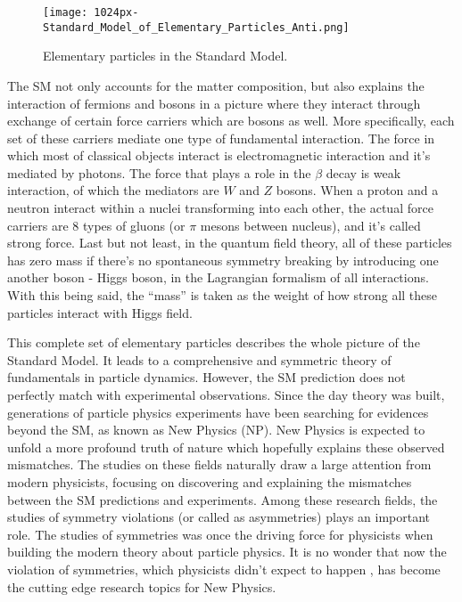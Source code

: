 \begin{figure}[H]
	\centering
	\texttt{[image: 1024px-Standard\_Model\_of\_Elementary\_Particles\_Anti.png]}
	\caption{Elementary particles in the Standard Model.\cite{sm_particles}}
	\label{fig:sm-table}
\end{figure}

The SM not only accounts for the matter composition, but also explains the interaction of fermions and bosons in a picture where they interact through exchange of certain force carriers which are bosons as well. More specifically, each set of these carriers mediate one type of fundamental interaction. The force in which most of classical objects interact is electromagnetic interaction and it's mediated by photons. The force that plays a role in the $\beta$ decay is weak interaction, of which the mediators are $\textit{W}$ and $\textit{Z}$ bosons. When a proton and a neutron interact within a nuclei transforming into each other, the actual force carriers are 8 types of gluons (or $\pi$ mesons between nucleus), and it's called strong force. Last but not least, in the quantum field theory, all of these particles has zero mass if there's no spontaneous symmetry breaking by introducing one another boson - Higgs boson, in the Lagrangian formalism of all interactions. With this being said, the ``mass'' is taken as the weight of how strong all these particles interact with Higgs field.

 This complete set of elementary particles describes the whole picture of the Standard Model. It leads to a comprehensive and symmetric theory of fundamentals in particle dynamics. However, the SM prediction does not perfectly match with experimental observations. Since the day theory was built, generations of particle physics experiments have been searching for evidences beyond the SM, as known as New Physics (NP). New Physics is expected to unfold a more profound truth of nature which hopefully explains these observed mismatches. The studies on these fields naturally draw a large attention from modern physicists, focusing on discovering and explaining the mismatches between the SM predictions and experiments. Among these research fields, the studies of symmetry violations (or called as asymmetries) plays an important role. The studies of symmetries was once the driving force for physicists when building the modern theory about particle physics. It is no wonder that now the violation of symmetries, which  physicists didn't expect to happen , has become the cutting edge research topics for New Physics. 





